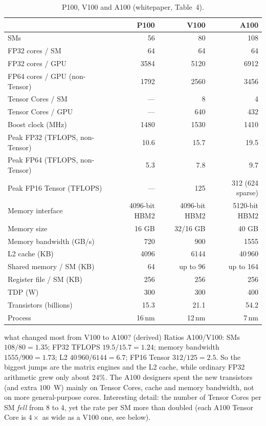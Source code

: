 \begin{table}[ht]
\centering\small
\begin{tabular}{@{}lrrr@{}}
\toprule
 & \textbf{P100} & \textbf{V100} & \textbf{A100}\\
\midrule
SMs & 56 & 80 & 108\\
FP32 cores / SM & 64 & 64 & 64\\
FP32 cores / GPU & 3584 & 5120 & 6912\\
FP64 cores / GPU (non-Tensor) & 1792 & 2560 & 3456\\
Tensor Cores / SM & --- & 8 & 4\\
Tensor Cores / GPU & --- & 640 & 432\\
Boost clock (MHz) & 1480 & 1530 & 1410\\
Peak FP32 (TFLOPS, non-Tensor) & 10.6 & 15.7 & 19.5\\
Peak FP64 (TFLOPS, non-Tensor) & 5.3 & 7.8 & 9.7\\
Peak FP16 Tensor (TFLOPS) & --- & 125 & 312 (624 sparse)\\
Memory interface & 4096-bit HBM2 & 4096-bit HBM2 & 5120-bit HBM2\\
Memory size & 16 GB & 32/16 GB & 40 GB\\
Memory bandwidth (GB/s) & 720 & 900 & 1555\\
L2 cache (KB) & 4096 & 6144 & 40\,960\\
Shared memory / SM (KB) & 64 & up to 96 & up to 164\\
Register file / SM (KB) & 256 & 256 & 256\\
TDP (W) & 300 & 300 & 400\\
Transistors (billions) & 15.3 & 21.1 & 54.2\\
Process & 16\,nm & 12\,nm & 7\,nm\\
\bottomrule
\end{tabular}
\caption{P100, V100 and A100 (whitepaper, Table~4).}
\label{tab:gen}
\end{table}

\begin{workedex}{what changed most from V100 to A100? (derived)}
Ratios A100/V100: SMs $108/80=1.35$; FP32 TFLOPS $19.5/15.7=1.24$; memory bandwidth $1555/900=1.73$; L2 $40\,960/6144=6.7$;
FP16 Tensor $312/125=2.5$. So the biggest jumps are the matrix engines and the L2 cache, while ordinary FP32 arithmetic grew only about $24\%$. The A100 designers
spent the new transistors (and extra $100$~W) mainly on Tensor Cores, cache and memory bandwidth, not on more general-purpose cores.
Interesting detail: the number of Tensor Cores per SM \emph{fell} from $8$ to $4$, yet the rate per SM more than doubled
(each A100 Tensor Core is $4\times$ as wide as a V100 one, see below).
\end{workedex}

